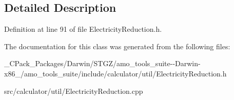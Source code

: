 \subsection{Detailed Description}


Definition at line 91 of file Electricity\+Reduction.\+h.



The documentation for this class was generated from the following files\+:\begin{DoxyCompactItemize}
\item 
\+\_\+\+C\+Pack\+\_\+\+Packages/\+Darwin/\+S\+T\+G\+Z/amo\+\_\+tools\+\_\+suite-\/-\/\+Darwin-\/x86\+\_/amo\+\_\+tools\+\_\+suite/include/calculator/util/Electricity\+Reduction.\+h\item 
src/calculator/util/Electricity\+Reduction.\+cpp\end{DoxyCompactItemize}
